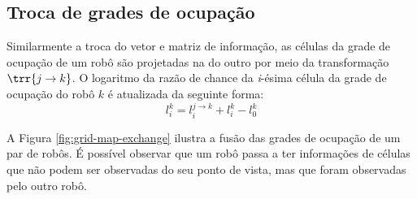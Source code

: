 \subsection{Troca de grades de ocupação}
Similarmente a troca do vetor e matriz de informação, as células da 
grade de ocupação de um robô são projetadas na do outro por meio da 
transformação $\trr{j \to k}$. O logaritmo da razão de chance da \textit{i}-ésima célula da grade de ocupação do robô $k$ é atualizada da 
seguinte forma:
\begin{equation}
  l_i^k = l_i^{j\to k} + l_i^k - l_0^k
\end{equation}

A Figura \ref{fig:grid-map-exchange} ilustra a fusão das grades de 
ocupação de um par de robôs. É possível observar que um robô passa a ter 
informações de células que não podem ser observadas do seu ponto de 
vista, mas que foram observadas pelo outro robô.

